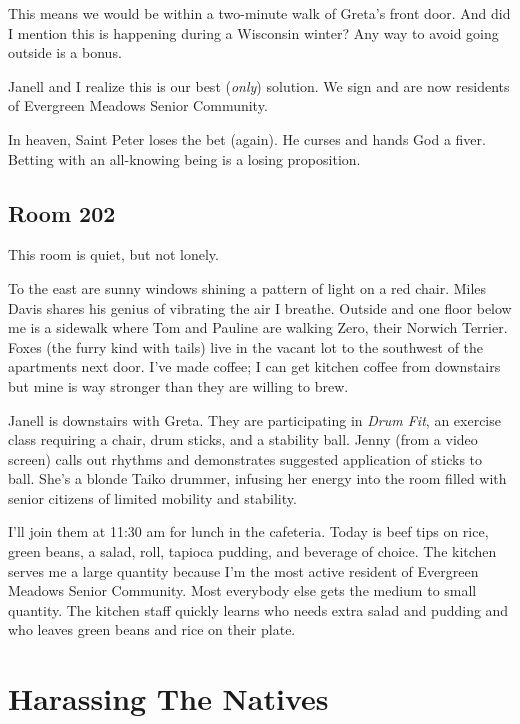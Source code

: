 \documentclass[
  letterpaper,
  DIV=11,
  numbers=noendperiod]{scrreprt}
\begin{document}
This means we would be within a two-minute walk of Greta's front door.
And did I mention this is happening during a Wisconsin winter? Any way
to avoid going outside is a bonus.

Janell and I realize this is our best (\emph{only}) solution. We sign
and are now residents of Evergreen Meadows Senior Community.

In heaven, Saint Peter loses the bet (again). He curses and hands God a
fiver. Betting with an all-knowing being is a losing proposition.

\section*{Room 202}\label{room-202}


This room is quiet, but not lonely.

To the east are sunny windows shining a pattern of light on a red chair.
Miles Davis shares his genius of vibrating the air I breathe. Outside
and one floor below me is a sidewalk where Tom and Pauline are walking
Zero, their Norwich Terrier. Foxes (the furry kind with tails) live in
the vacant lot to the southwest of the apartments next door. I've made
coffee; I can get kitchen coffee from downstairs but mine is way
stronger than they are willing to brew.

Janell is downstairs with Greta. They are participating in \emph{Drum
Fit}, an exercise class requiring a chair, drum sticks, and a stability
ball. Jenny (from a video screen) calls out rhythms and demonstrates
suggested application of sticks to ball. She's a blonde Taiko drummer,
infusing her energy into the room filled with senior citizens of limited
mobility and stability.

I'll join them at 11:30 am for lunch in the cafeteria. Today is beef
tips on rice, green beans, a salad, roll, tapioca pudding, and beverage
of choice. The kitchen serves me a large quantity because I'm the most
active resident of Evergreen Meadows Senior Community. Most everybody
else gets the medium to small quantity. The kitchen staff quickly learns
who needs extra salad and pudding and who leaves green beans and rice on
their plate.


\chapter*{Harassing The Natives}\label{harassing-the-natives}
\end{document}
